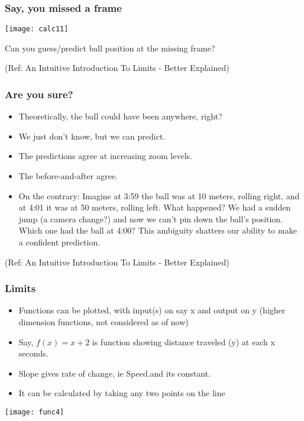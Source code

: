  \begin{frame}[fragile]\frametitle{Say, you missed a frame}


\begin{center}
\texttt{[image: calc11]}

\end{center}

Can you guess/predict ball position at the missing frame?

\tiny{(Ref: An Intuitive Introduction To Limits - Better Explained)}
\end{frame}

 \begin{frame}[fragile]\frametitle{Are you sure?}

 

\begin{itemize}
\item Theoretically, the ball could have been anywhere, right?
\item We just don't know, but we can predict.
\item The predictions agree at increasing zoom levels.
\item The before-and-after agree. 
\item On the contrary: Imagine at 3:59 the ball was at 10 meters, rolling right, and at 4:01 it was at 50 meters, rolling left. What happened? We had a sudden jump (a camera change?) and now we can’t pin down the ball’s position. Which one had the ball at 4:00? This ambiguity shatters our ability to make a confident prediction.
\end{itemize}

\tiny{(Ref: An Intuitive Introduction To Limits - Better Explained)}
\end{frame}

 \begin{frame}[fragile]\frametitle{Limits}
\begin{itemize}
\item Functions can be plotted, with input(s) on say x and output on y (higher dimension functions, not considered as of now)
\item Say, $f(x) = x + 2$ is function showing distance traveled (y) at each x seconds.
\item Slope gives rate of change, ie Speed.and its constant.
\item It can be calculated by taking any two points on the line
\end{itemize}
\begin{center}
\texttt{[image: func4]}
\end{center}
\end{frame}

